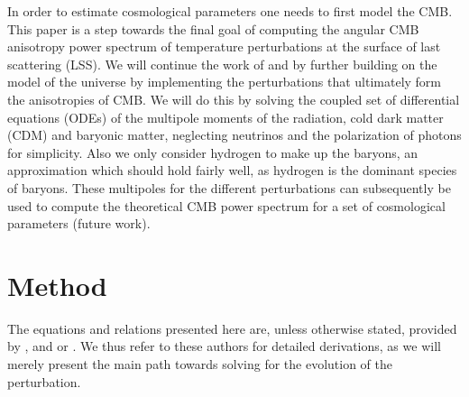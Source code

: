 \documentclass[twocolumn]{aastex62}
\begin{document}
In order to estimate cosmological parameters one needs to first model the CMB. This paper is a step towards the final goal of computing the angular CMB anisotropy power spectrum of temperature perturbations at the surface of last scattering (LSS). We will continue the work of \cite{stutzer:2020a} and \cite{stutzer:2020b} by further building on the model of the universe by implementing the perturbations that ultimately form the anisotropies of CMB. We will do this by solving the coupled set of differential equations (ODEs) of the multipole moments of the radiation, cold dark matter (CDM) and baryonic matter, neglecting neutrinos and the polarization of photons for simplicity. Also we only consider hydrogen to make up the baryons, an approximation which should hold fairly well, as hydrogen is the dominant species of baryons. These multipoles for the different perturbations can subsequently be used to compute the theoretical CMB power spectrum for a set of cosmological parameters (future work).

\section{Method} \label{sec:Method}
The equations and relations presented here are, unless otherwise stated, provided by \cite{callin:2006}, \cite{winther:2020b} and or \cite{dodelson:2003}. We thus refer to these authors for detailed derivations, as we will merely present the main path towards solving for the evolution of the perturbation.
\end{document}
